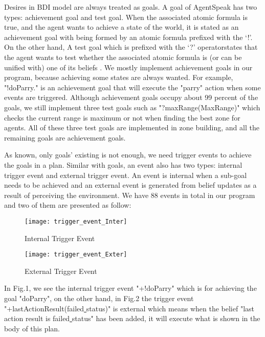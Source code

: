 \documentclass{llncs}
\begin{document}
Desires in BDI model are always treated as goals. A goal of AgentSpeak has two types: achievement goal and test goal. When the associated atomic formula is true, and the agent wants to achieve a state of the world, it is stated as an achievement goal with being formed by an atomic formula prefixed with the ‘!’. On the other hand, A test goal which is prefixed with the ‘?’ operatorstates that the agent wants to test whether the associated atomic formula is (or can be unified with) one of its beliefs \cite{rafael_BDIAgent_2005}. We mostly implement achievement goals in our program, because achieving some states are always wanted. For example, "!doParry." is an achievement goal that will execute the "parry" action when some events are triggered. Although achievement goals occupy about 99 percent of the goals, we still implement three test goals such as "?maxRange(MaxRange)" which checks the current range is maximum or not when finding the best zone for agents. All of these three test goals are implemented in zone building, and all the remaining goals are achievement goals.

As known, only goals' existing is not enough, we need trigger events to achieve the goals in a plan. Similar with goals, an event also has two types: internal trigger event and external trigger event. An event is internal when a sub-goal needs to be achieved and an external event is generated from belief updates as a result of perceiving the environment. We have 88 events in total in our program and two of them are presented as follow:
\begin{figure}
\centering%
\begin{minipage}[!htbp]{\linewidth}
\texttt{[image: trigger\_event\_Inter]}
\caption{Internal Trigger Event}
\label{fig:latticen}
\end{minipage}
\begin{minipage}[!htbp]{\linewidth}
\texttt{[image: trigger\_event\_Exter]}
\caption{External Trigger Event}
\label{fig:baselinex}
\end{minipage}
\end{figure}

In Fig.1, we see the internal trigger event "+!doParry" which is for achieving the goal "doParry", on the other hand, in Fig.2 the trigger event "+lastActionResult(failed\underline{ }status)" is external which means when the belief "last action result is failed\underline{ }status" has been added, it will execute what is shown in the body of this plan.
\end{document}

